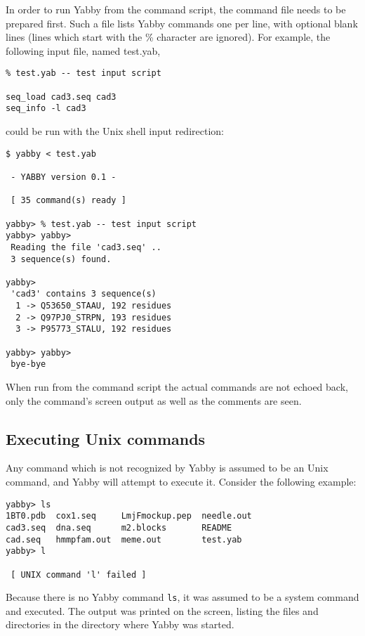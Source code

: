 In order to run Yabby from the command script, the command file
needs to be prepared first. Such a file lists Yabby commands
one per line, with optional blank lines (lines which start with
the \% character are ignored). For example, the following input
file, named test.yab,

\begin{verbatim}
% test.yab -- test input script

seq_load cad3.seq cad3
seq_info -l cad3
\end{verbatim}

could be run with the Unix shell input redirection:

\begin{verbatim}
$ yabby < test.yab

 - YABBY version 0.1 - 

 [ 35 command(s) ready ]

yabby> % test.yab -- test input script
yabby> yabby> 
 Reading the file 'cad3.seq' ..
 3 sequence(s) found.

yabby> 
 'cad3' contains 3 sequence(s)
  1 -> Q53650_STAAU, 192 residues
  2 -> Q97PJ0_STRPN, 193 residues
  3 -> P95773_STALU, 192 residues

yabby> yabby> 
 bye-bye
\end{verbatim}

When run from the command script the actual commands are not
echoed back, only the command's screen output as well as the
comments are seen.

\subsection{Executing Unix commands}


Any command which is not recognized by Yabby is assumed to be
an Unix command, and Yabby will attempt to execute it. Consider
the following example:

\begin{verbatim}
yabby> ls
1BT0.pdb  cox1.seq     LmjFmockup.pep  needle.out
cad3.seq  dna.seq      m2.blocks       README
cad.seq   hmmpfam.out  meme.out        test.yab
yabby> l

 [ UNIX command 'l' failed ]
\end{verbatim}

Because there is no Yabby command {\tt ls}, it was assumed to
be a system command and executed.  The output was printed on
the screen, listing the files and directories in the directory
where Yabby was started.

